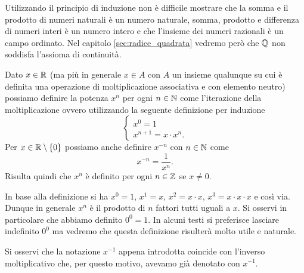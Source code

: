 
Utilizzando il principio di induzione non è difficile mostrare che
la somma e il prodotto di numeri naturali è un numero naturale,
somma, prodotto e differenza
di numeri interi è un numero intero e che l'insieme dei numeri
razionali è un campo ordinato.
Nel capitolo \ref{sec:radice_quadrata}
vedremo però che $\mathbb Q$ non soddisfa l'assioma di continuità.

\begin{definition}
Dato $x \in \mathbb R$ (ma più in generale $x\in A$ con $A$ un insieme qualunque su cui è definita una operazione di moltiplicazione associativa e con elemento neutro) possiamo definire la potenza $x^n$ per ogni
$n\in \mathbb N$ come l'iterazione della moltiplicazione
ovvero utilizzando
la seguente definizione per induzione
\[
\begin{cases}
  x^0 = 1\\
  x^{n+1} = x\cdot x^n.
\end{cases}
\]
Per $x\in \mathbb R\setminus{\left\{ 0 \right\}}$ possiamo anche definire $x^{-n}$ con $n\in \mathbb N$
come
\[
x^{-n} = \frac{1}{x^n}.
\]
Risulta quindi che $x^n$ è definito per ogni $n\in \mathbb Z$ se $x\neq 0$.
\end{definition}

In base alla definizione si ha $x^0 = 1$, $x^1=x$, $x^2=x\cdot x$,
$x^3=x\cdot x \cdot x$ e così via. Dunque in generale
$x^n$ è il prodotto di $n$ fattori tutti uguali a $x$.
Si osservi in particolare che abbiamo definito $0^0=1$.
In alcuni testi si preferisce lasciare indefinito $0^0$
ma vedremo che questa definizione risulterà
molto utile e naturale.

Si osservi che la notazione
$x^{-1}$ appena introdotta coincide
con l'inverso moltiplicativo che, per questo motivo, avevamo già denotato
con $x^{-1}$.

